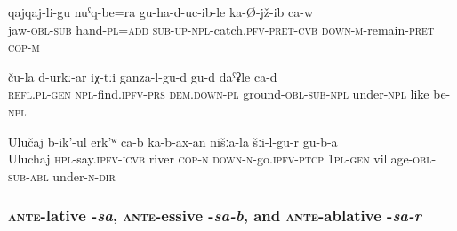 \begin{exe}	
	\ex	\label{He is sitting with his hands holding his head}
	\gll	qajqaj-li-gu	nuˁq-be=ra	gu-ha-d-uc-ib-le	ka-Ø-jž-ib ca-w\\
		jaw-\textsc{obl}-\textsc{sub}	hand-\textsc{pl}=\textsc{add}	\textsc{sub-up-npl}-catch.\textsc{pfv}-\textsc{pret}-\textsc{cvb}	\textsc{down-m}-remain-\textsc{pret} \textsc{cop-m}\\
	\glt	{}
	
	\ex	\label{Their, these (vegetables) are probably (growing) under the ground}
	\gll	ču-la	d-urkː-ar	iχ-tːi	ganza-l-gu-d	gu-d	daˁʡle	ca-d\\
		\textsc{refl}.\textsc{pl}-\textsc{gen}	\textsc{npl}-find.\textsc{ipfv}-\textsc{prs}	\textsc{dem.down-pl}	ground-\textsc{obl}-\textsc{sub}-\textsc{npl}	under-\textsc{npl}	like	be-\textsc{npl}\\
	\glt	{}

	
	\ex	\label{The river with the name Uluchaj is passing by down from our village}
	\gll	Ulučaj	b-ik'-ul	erk'ʷ	ca-b	ka-b-ax-an	nišːa-la	šːi-l-gu-r	gu-b-a\\
		Uluchaj	\textsc{hpl}-say.\textsc{ipfv}-\textsc{icvb}	river	\textsc{cop-n}	\textsc{down-n}-go.\textsc{ipfv}-\textsc{ptcp}	1\textsc{pl}-\textsc{gen}	village-\textsc{obl}-\textsc{sub}-\textsc{abl}	under-\textsc{n}-\textsc{dir}\\
	\glt	{}
\end{exe}


\subsubsection{\textsc{ante}-lative -\textit{sa}, \textsc{ante}-essive -\textit{sa-b}, and \textsc{ante}-ablative -\textit{sa-r}}
\label{sssec:ante-lative -sa, ante-essive -sa-b, and ante-ablative -sa-r}

